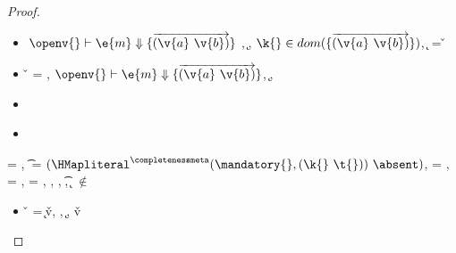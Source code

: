 \begin{lemma}
\begin{enumerate}
\begin{proof}
\begin{case}[T-GetHMapPartialDefault]
  \begin{itemize}
    \item[]
      \begin{subcase}[B-Get]
        $\opsem {\openv{}}
        {\e{m}} {\curlymap{\overrightarrow{({\v{a}}\ {\v{b}})}}}$
        ,
         \opsem {\openv{}}
                 {} {\k{}},
         $\keyinmap{\k{}}{\curlymap{\overrightarrow{({\v{a}}\ {\v{b}})}}}$,
          {\k{}} = {\v{}}

      \end{subcase}
    \item[]
      \begin{subcase}[B-GetMissing]
        \v{} = \nil,
        $\opsem {\openv{}}
        {\e{m}} {\curlymap{\overrightarrow{({\v{a}}\ {\v{b}})}}}$,
       \opsem {\openv{}} {} {\k{}},

      \end{subcase}
    \item[]
      \begin{subcase}[BE-Get1]
      \end{subcase}
    \item[]
      \begin{subcase}[BE-Get2]
      \end{subcase}
  \end{itemize}
\end{case}

\begin{case}[T-AssocHMap]
  \e{} = { {} {}},
  \t{} = ${\HMapgeneric {\extendmandatoryset {\mandatory{}}{\k{}}{\t{}}} {\absent}}$,
  \thenprop{\prop{}} = {\topprop{}},
  \elseprop{\prop{}} = {\botprop{}},
  \object{} = \emptyobject,
  \judgementtwo {\propenv{}} { {\HMapgeneric {\mandatory{}} {\absent}}},
  \judgementtwo {\propenv{}} { {\Value{\k{}}}},
  \judgementtwo {\propenv{}} { {\t{}}},
  {\k{}} $\not\in$ {\absent{}}

  \begin{itemize}
    \item[]
      \begin{subcase}[B-Assoc]
        \v{} = 
        {
                {\k{}}{\v{v}}},
        \opsem {\openv{}}
        {} {},
        \opsem {\openv{}} {} {\k{}},
        \opsem {\openv{}} {} {\v{v}}


\end{subcase}
\end{itemize}
\end{case}
\end{proof}
\end{enumerate}
\end{lemma}
